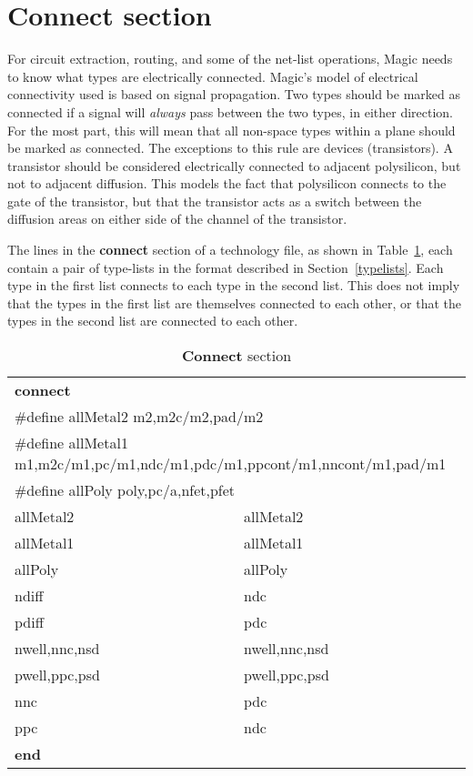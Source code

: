 \documentclass[letterpaper,twoside,12pt]{article}
\begin{document}
\section{Connect section}

For circuit extraction, routing, and some of the net-list operations,
Magic needs to know what types are electrically connected.
Magic's model of electrical connectivity used is based on signal propagation.
Two types should be marked as connected if a signal will
{\itshape always}
pass between the two types, in either direction.
For the most part, this will mean that all non-space types within a plane
should be marked as connected.
The exceptions to this rule are devices (transistors).
A transistor should be considered electrically
connected to adjacent polysilicon, but not to adjacent diffusion.
This models the fact that polysilicon connects to the gate of
the transistor, but that the transistor acts as a switch
between the diffusion areas on either side of the channel of the transistor.

The lines in the {\bfseries connect}
section of a technology file, as shown in Table~\ref{connect},
each contain a pair of type-lists in the format described in
Section~\ref{typelists}.
Each type in the first list connects to each type in the second list.
This does not imply that the types in the first list are themselves
connected to each other, or that the types in the second list are
connected to each other.

\begin{table}[ht]
   \begin{center}
      \begin{tabular}{|l@{\hspace*{1.5in}}l|} \hline
	{\bfseries connect} & \\
	\multicolumn{2}{|l|}{\#define allMetal2 m2,m2c/m2,pad/m2} \\
	\multicolumn{2}{|l|}{\#define allMetal1
		m1,m2c/m1,pc/m1,ndc/m1,pdc/m1,ppcont/m1,nncont/m1,pad/m1} \\
	\multicolumn{2}{|l|}{\#define allPoly poly,pc/a,nfet,pfet} \\
	allMetal2	& allMetal2 \\
	allMetal1	& allMetal1 \\
	allPoly		& allPoly \\
	ndiff		& ndc \\
	pdiff		& pdc \\
	nwell,nnc,nsd	& nwell,nnc,nsd \\
	pwell,ppc,psd	& pwell,ppc,psd \\
	nnc		& pdc \\
	ppc		& ndc \\
	{\bfseries end} & \\ \hline
      \end{tabular}
      \caption{{\bfseries Connect} section}
      \label{connect}
   \end{center}
\end{table}
\end{document}
